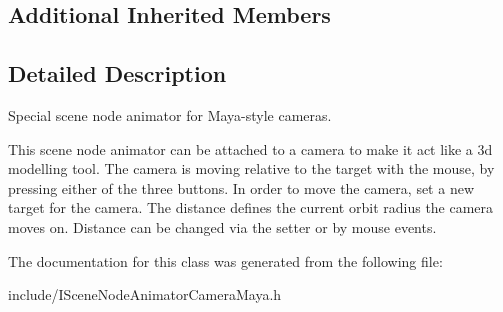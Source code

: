 \subsection*{Additional Inherited Members}


\subsection{Detailed Description}
Special scene node animator for Maya-\/style cameras. 

This scene node animator can be attached to a camera to make it act like a 3d modelling tool. The camera is moving relative to the target with the mouse, by pressing either of the three buttons. In order to move the camera, set a new target for the camera. The distance defines the current orbit radius the camera moves on. Distance can be changed via the setter or by mouse events. 

The documentation for this class was generated from the following file\+:\begin{DoxyCompactItemize}
\item 
include/I\+Scene\+Node\+Animator\+Camera\+Maya.\+h\end{DoxyCompactItemize}
